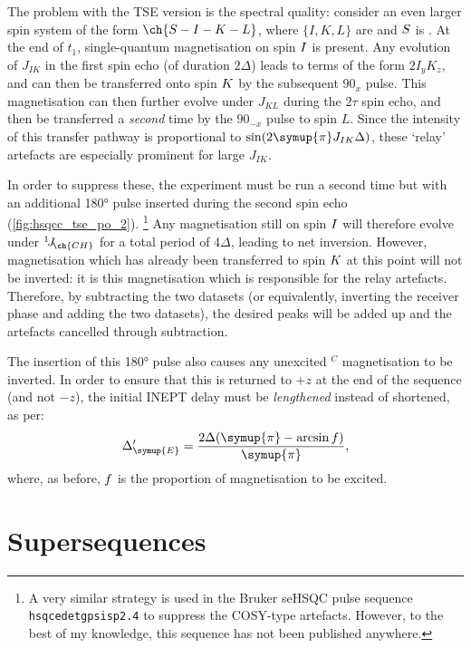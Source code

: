 \documentclass[a4paper,12pt]{article}
\newcommand{\proton}{\ch{^{1}H}}
\newcommand{\carbon}{\ch{^{13}C}}
\newcommand{\DeltaE}{\Delta_{\symup{E}}}
\newcommand{\magn}[1]{\ch{^1H}$^{#1}$}
\newcommand{\angang}[2]{#1\rlap{\unit{\degree}}\ensuremath{_{#2}}}
\newcommand{\oneJ}[1]{{}^{1}\!J_{\!\ch{#1}}}
\newcommand{\cpi}{\symup{\pi}}
\begin{document}
\begin{refsection}
The problem with the TSE version is the spectral quality: consider an even larger spin system of the form $\ch{S-I-K-L}$, where $\{I,K,L\}$ are \proton{} and $S\/$ is \carbon{}.
At the end of $t_1$, single-quantum magnetisation on spin $I\/$ is present.
Any evolution of $J_{IK}$ in the first spin echo (of duration $2\Delta$) leads to terms of the form $2I_yK_z$, and can then be transferred onto spin $K\/$ by the subsequent \angang{90}{x} pulse.
This magnetisation can then further evolve under $J_{KL}$ during the $2\tau$ spin echo, and then be transferred a \textit{second} time by the \angang{90}{-x} pulse to spin $L$.
Since the intensity of this transfer pathway is proportional to $\sin(2\cpi J_{IK}\Delta)$, these `relay' artefacts are especially prominent for large $J_{IK}$.

In order to suppress these, the experiment must be run a second time but with an additional \ang{180} \carbon{} pulse inserted during the second spin echo (\cref{fig:hsqcc_tse_po_2}).%
\footnote{A very similar strategy is used in the Bruker seHSQC pulse sequence \texttt{hsqcedetgpsisp2.4} to suppress the COSY-type artefacts. However, to the best of my knowledge, this sequence has not been published anywhere.}
Any magnetisation still on spin $I\/$ will therefore evolve under $\oneJ{CH}$ for a total period of $4\Delta$, leading to net inversion.
However, magnetisation which has already been transferred to spin $K\/$ at this point will not be inverted: it is this magnetisation which is responsible for the relay artefacts.
Therefore, by subtracting the two datasets (or equivalently, inverting the receiver phase and adding the two datasets), the desired peaks will be added up and the artefacts cancelled through subtraction.

The insertion of this \ang{180} pulse also causes any unexcited \magn{C} magnetisation to be inverted.
In order to ensure that this is returned to $+z$ at the end of the sequence (and not $-z$), the initial INEPT delay must be \textit{lengthened} instead of shortened, as per:
\begin{equation}
    \label{eq:delta_e_prime}
    \DeltaE' = \frac{2\Delta (\cpi - \arcsin f)}{\cpi},
\end{equation}
where, as before, $f\/$ is the proportion of magnetisation to be excited.


\section{Supersequences}


\end{refsection}
\end{document}
